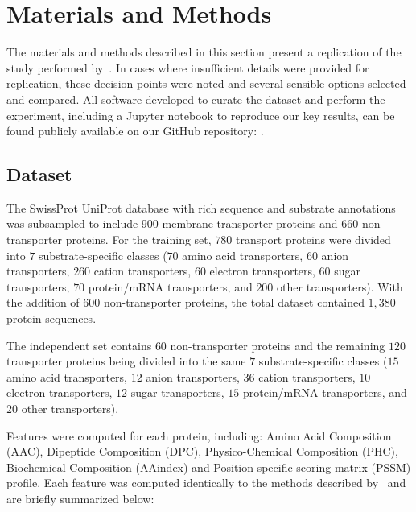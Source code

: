 \chapter{Materials and Methods}

\label{sec:materials}
The materials and methods described in this section present a replication of the study performed
by~\cite{mishra_prediction_2014}. In cases where insufficient details were provided for replication,
these decision points were noted and several sensible options selected and compared. All software 
developed to curate the dataset and perform the experiment, including a Jupyter notebook to reproduce our key results, can be found publicly available on
our GitHub repository: .

\section{Dataset}
\label{sec:dataset}

The SwissProt UniProt database with rich sequence and substrate
annotations~\cite{boeckmann2003swiss} was subsampled to include $900$ membrane transporter proteins and $660$
non-transporter proteins. For the training set, $780$ transport proteins were divided into $7$ substrate-specific 
classes ($70$ amino acid transporters, $60$ anion transporters, $260$ cation transporters, $60$ electron transporters, $60$ 
sugar transporters, $70$ protein/mRNA transporters, and $200$ other transporters). With the addition of 600 non-transporter
proteins, the total dataset contained $1,380$ protein sequences. 

The independent set contains $60$ non-transporter proteins
and the remaining $120$ transporter proteins being divided into the same $7$ substrate-specific classes 
($15$ amino acid transporters, $12$ anion transporters, $36$ cation transporters, $10$ electron transporters, 
$12$ sugar transporters, $15$ protein/mRNA transporters, and $20$ other transporters).

Features were computed for each protein, including: Amino Acid Composition (AAC), Dipeptide Composition (DPC),
Physico-Chemical Composition (PHC), Biochemical Composition (AAindex) and Position-specific scoring matrix (PSSM)
profile. Each feature was computed identically to the methods described by~\cite{mishra_prediction_2014} and are briefly
summarized below:

